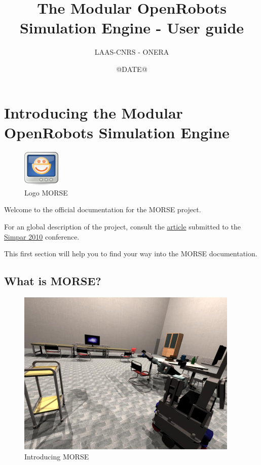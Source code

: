 \documentclass[twoside,a4paper,10pt]{report}
\title{The Modular OpenRobots Simulation Engine - User guide}
\author{LAAS-CNRS - ONERA}
\date{@DATE@}
\newcommand{\dokutitlelevelone}[1]{\chapter{#1}}
\newcommand{\dokutitleleveltwo}[1]{\section{#1}}
\begin{document}
\sffamily
\allsectionsfont{\sffamily}


\thispagestyle{empty}
\maketitle
\thispagestyle{empty}
\cleardoublepage
\tableofcontents
\newpage
\thispagestyle{plain}
\cleardoublepage
\newpage





\dokutitlelevelone{Introducing the Modular OpenRobots Simulation Engine}
\label{55d4061a5aa52cfc82c5474279f29bd9}%
\label{a80da1282f2c775bbc5f2c92c836968b}%

\begin{figure}[h]
\centering
\includegraphics[width=50pt]{openrobots-simulator.png}
\caption{Logo MORSE}
\end{figure}


Welcome to the official documentation for the MORSE project.

For an global description of the project, consult the 
\href{http://homepages.laas.fr/gechever/Documents/morse-21062010.pdf}{ article}
submitted to the \href{http://www.simpar.org/}{ Simpar 2010} conference.

This first section will help you to find your way into the MORSE documentation.


\dokutitleleveltwo{What is MORSE?}
\label{cb90401e2d53fdeab390406232e6c72f}%

\begin{figure}[h]
\raggedleft
\includegraphics[width=300pt]{simu_render_indoors.jpg}
\caption{Introducing MORSE}
\end{figure}
\end{document}
